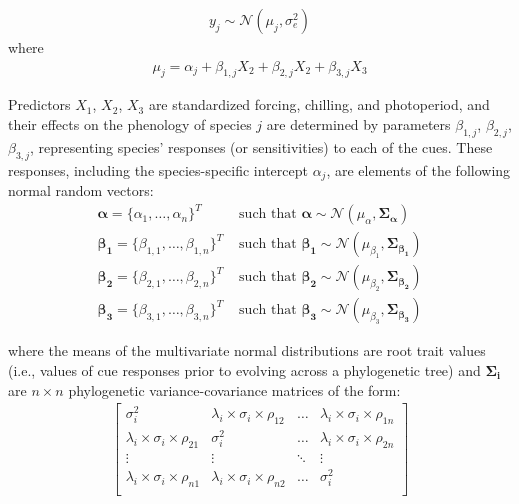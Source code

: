 \documentclass{article}\usepackage[]{graphicx}\usepackage[]{color}
\begin{document}
\begin{align}
  \label{modely}
  y_j \sim \mathcal{N}(\mu_j, \sigma_e^2)
\end{align}
where
\begin{align}
  \label{modelmu}
  \mu_j = \alpha_j + \beta_{1,j} X_2 + \beta_{2,j} X_2 + \beta_{3,j} X_3
\end{align}

Predictors $X_1$, $X_2$, $X_3$ are standardized forcing, chilling, and photoperiod, and their effects on the phenology of species $j$ are determined by parameters $\beta_{1,j}$, $\beta_{2,j}$, $\beta_{3,j}$, representing species' responses (or sensitivities) to each of the cues. These responses, including the species-specific intercept $\alpha_j$, are elements of the following normal random vectors:
\begin{align}
    \label{phybetas}
  \boldsymbol{\alpha} = \{\alpha_1, \ldots, \alpha_n\}^T & \text{ such that }
  \boldsymbol{\alpha} \sim \mathcal{N}(\mu_{\alpha},\boldsymbol{\Sigma_{\alpha}}) \\
  \boldsymbol{\beta_1} =  \{\beta_{1,1}, \ldots, \beta_{1,n}\}^T & \text{ such that }
  \boldsymbol{\beta_1} \sim \mathcal{N}(\mu_{\beta_1},\boldsymbol{\Sigma_{\beta_1}}) \nonumber \\
  \boldsymbol{\beta_2} =  \{\beta_{2,1}, \ldots, \beta_{2,n}\}^T & \text{ such that }
  \boldsymbol{\beta_2} \sim \mathcal{N}(\mu_{\beta_2},\boldsymbol{\Sigma_{\beta_2}}) \nonumber \\
  \boldsymbol{\beta_3} =  \{\beta_{3,1}, \ldots, \beta_{3,n}\}^T & \text{ such that }
  \boldsymbol{\beta_3} \sim \mathcal{N}(\mu_{\beta_3},\boldsymbol{\Sigma_{\beta_3}}) \nonumber
\end{align}

\noindent where the means of the multivariate normal distributions are root trait values (i.e., values of cue responses prior to evolving across a phylogenetic tree) and $\boldsymbol{\Sigma_i}$ %
are $n \times n$ phylogenetic variance-covariance matrices of the form: \\ 
\begin{align}
  \label{phymat}
\begin{bmatrix}
  \sigma^2_i & \lambda_i \times \sigma_{i} \times \rho_{12} & \ldots & \lambda_i \times \sigma_{i} \times \rho_{1n} \\
  \lambda_i \times \sigma_i \times \rho_{21} & \sigma^2_i & \ldots & \lambda_i \times \sigma_{i} \times \rho_{2n} \\
  \vdots & \vdots & \ddots & \vdots \\
  \lambda_i \times \sigma_i \times \rho_{n1} & \lambda_i \times \sigma_i \times \rho_{n2} & \ldots & \sigma^2_i \\
\end{bmatrix}
\end{align}
\end{document}
